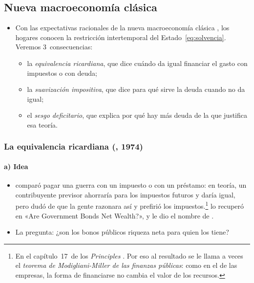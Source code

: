 \documentclass[11pt]{article}
\begin{document}
\subsection{Nueva macroeconomía clásica}\label{sec:nmc}

\begin{itemize}
\item Con las expectativas racionales de la nueva macroeconomía clásica , los hogares conocen la restricción intertemporal del Estado~\eqref{eq:solvencia}. Veremos 3~consecuencias:
  \begin{itemize}
  \item la \emph{equivalencia ricardiana}, que dice cuándo da igual financiar el gasto con impuestos o con deuda;
  \item la \emph{suavización impositiva}, que dice para qué sirve la deuda cuando no da igual;
  \item el \emph{sesgo deficitario}, que explica por qué hay más deuda de la que justifica esa teoría.
  \end{itemize}
\end{itemize}

\subsubsection{La equivalencia ricardiana (, 1974)}\label{sec:ricardiana}

\paragraph{a) Idea}

\begin{itemize}
\item {} comparó pagar una guerra con un impuesto o con un préstamo: en teoría, un contribuyente previsor ahorraría para los impuestos futuros y daría igual, pero dudó de que la gente razonara así y prefirió los impuestos.\footnote{En el capítulo~17~de los \emph{Principles}\nocite{Ricardo1821Principles} . Por eso al resultado se le llama a veces el \emph{teorema de Modigliani-Miller de las finanzas públicas}: como en el de las empresas, la forma de financiarse no cambia el valor de los recursos.} \textcite{Barro1974} lo recuperó en «Are Government Bonds Net Wealth?», y \textcite{Buchanan1976Barro} le dio el nombre de .
\item La pregunta: ¿son los bonos públicos riqueza neta para quien los tiene?
\end{itemize}
\end{document}
